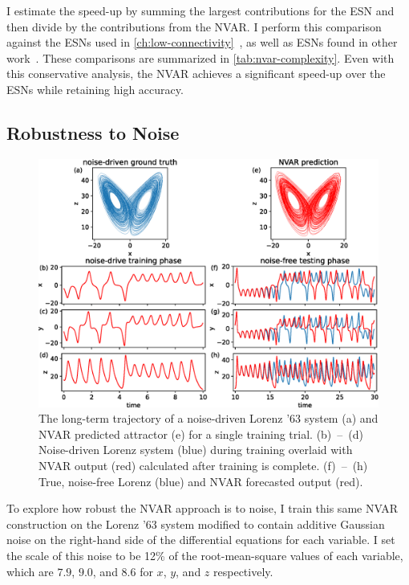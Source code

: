 I estimate the speed-up by summing the largest contributions for the
ESN and then divide by the contributions from the NVAR. I perform this
comparison against the ESNs used in
\cref{ch:low-connectivity}~\cite{griffith2019}, as well as ESNs found
in other work~\cite{pathak2017,lu2018}. These comparisons are
summarized in \cref{tab:nvar-complexity}. Even with this conservative
analysis, the NVAR achieves a significant speed-up over the ESNs while
retaining high accuracy.

\subsection{Robustness to Noise}

\begin{figure}
  \includegraphics[width=\textwidth]{figures/nvar-predict-lorenz-noisy}
  \caption{The long-term trajectory of a noise-driven Lorenz '63 system (a) and NVAR predicted attractor
    (e) for a single training trial. (b)~--~(d) Noise-driven Lorenz system
    (blue) during training overlaid with NVAR output (red) calculated
    after training is complete. (f)~--~(h) True, noise-free Lorenz (blue) and NVAR
    forecasted output (red).}
  \label{fig:nvar-predict-lorenz-noisy}
\end{figure}

To explore how robust the NVAR approach is to noise, I train this same
NVAR construction on the Lorenz '63 system modified to contain
additive Gaussian noise on the right-hand side of the differential
equations for each variable. I set the scale of this noise to be 12\%
of the root-mean-square values of each variable, which are $7.9$,
$9.0$, and $8.6$ for $x$, $y$, and $z$ respectively.

